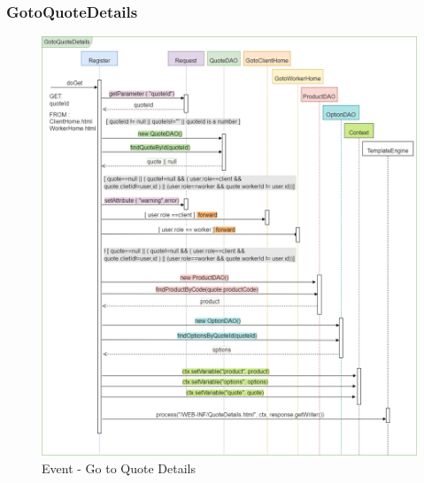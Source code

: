 \documentclass[a4paper, 12pt]{article}
\begin{document}
\subsubsection{GotoQuoteDetails}
\begin{figure}[h!]
	\centering
	\includegraphics[width=1\textwidth]{PureHTML_images/GotoQuoteDetails.png}
	\caption{Event - Go to Quote Details}
	\label{figure:gotoquotedetails_sd}
\end{figure}
\newpage
\end{document}
